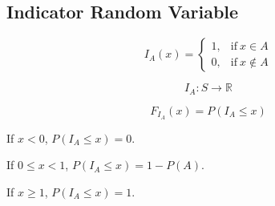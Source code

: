 \documentclass{article}
\begin{document}
\subsection{Indicator Random Variable}
\begin{equation*}
    I_A (x)=
    \begin{cases}
      1, & \text{if}\ x \in A \\
      0, & \text{if}\ x \notin A
    \end{cases}
\end{equation*}

$$I_A:S \to \mathbb{R}$$

$$ F_{I_{A}} (x)= P(I_A \leq x)$$

If $x < 0 $, $P(I_A \leq x)= 0$.

If $0 \leq x <1 $, $P(I_A \leq x)= 1-P(A)$.

If $x \geq 1 $, $P(I_A \leq x)= 1$.
\end{document}
